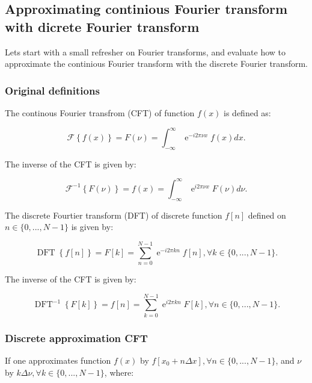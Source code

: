 \subsection{Approximating continious Fourier transform with dicrete Fourier transform}
Lets start with a small refresher on Fourier transforms, and evaluate how to approximate the continious Fourier transform with the discrete Fourier transform.

\subsubsection{Original definitions}
The continous Fourier transfrom (CFT) of function $f(x)$ is defined as:

\begin{equation}\label{eq_def_CFT}
\mathcal{F}\left\{f(x)\right\} = F(\nu) = \int^{\infty}_{-\infty} \operatorname{e}^{-i2\pi\nu x} f(x) dx.
\end{equation}


The inverse of the CFT is given by:

\begin{equation}\label{eq_def_iCFT}
\mathcal{F}^{-1}\left\{F(\nu)\right\} = f(x) = \int^{\infty}_{-\infty} \operatorname{e}^{i2\pi\nu x} F(\nu) d\nu.
\end{equation}

The discrete Fourtier transform (DFT) of discrete function $f[n]$ defined on $n \in \{0, ..., N-1\}$ is given by:

\begin{equation}\label{eq_def_DFT}
\operatorname{DFT}\left\{f[n]\right\} = F[k] = \sum^{N-1}_{n=0} \operatorname{e}^{-i2\pi kn} f[n], \forall k \in \{0, ..., N-1\}.
\end{equation}


The inverse of the CFT is given by:

\begin{equation}\label{eq_def_iDFT}
\operatorname{DFT}^{-1}\left\{F[k]\right\} = f[n] = \sum^{N-1}_{k=0} \operatorname{e}^{i2\pi kn} F[k], \forall n \in \{0, ..., N-1\}.
\end{equation}

\subsubsection{Discrete approximation CFT}


If one approximates function $f(x)$ by $f[x_0 + n\Delta x], \forall n \in \{0,...,N-1\}$, and $\nu$ by $k\Delta \nu, \forall k \in \{0, ..., N-1\}$, where:

